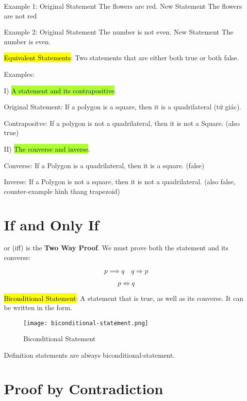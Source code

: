 Example 1: Original Statement The flowers are red. New Statement The flowers are not red

Example 2: Original Statement The number is not even. New Statement The number is even.

\vspace{.6cm}

\hl{Equivalent Statements}: Two statements that are either both true or both false.

Examples:

I) \colorbox{GreenYellow}{A statement and its contrapositive}.

Original Statement: If a polygon is a square, then it is a quadrilateral (tứ giác).

Contrapositve: If a polygon is not a quadrilateral, then it is not a Square. (also true)

\vspace{.4cm}

II) \colorbox{GreenYellow}{The converse and inverse}.

Converse: If a Polygon is a quadrilateral, then it is a square. (false)

Inverse: If a Polygon is not a square, then it is not a quadrilateral. (also false, counter-example hình thang trapezoid)

\section{If and Only If}

 or (iff) is the \textbf{Two Way Proof}. We must prove both the statement and its converse:

\[p \implies q \quad q \Longrightarrow p\]

\[p \iff q\]

\hl{Biconditional Statement}: A statement that is true, as well as its converse. It can be written in the  form.

\begin{figure}[htb!]
  \centering
  \texttt{[image: biconditional-statement.png]}
  \caption{Biconditional Statement}
\end{figure}

Definition statements are always biconditional-statement.

\section{Proof by Contradiction}


